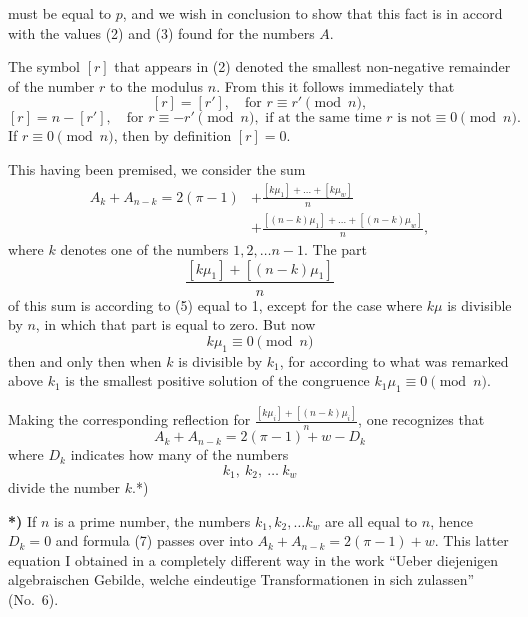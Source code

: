 \documentclass{article}
\begin{document}
must be equal to $p$, and we wish in conclusion to show that this fact is in accord with the values (2) and (3) found for the numbers $A$.

The symbol $[r]$ that appears in (2) denoted the smallest non-negative remainder of the number $r$ to the modulus $n$. From this it follows immediately that
\[
[r] = [r'], \quad \text{for } r \equiv r' \pmod n, \tag{4}
\]
\[
[r] = n - [r'], \quad \text{for } r \equiv -r' \pmod n, \text{ if at the same time } r \text{ is not} \equiv 0 \pmod n. \tag{5}
\]
If $r \equiv 0 \pmod n$, then by definition $[r] = 0$.

This having been premised, we consider the sum
\[
\begin{aligned}
A_k + A_{n-k} = 2(\pi - 1) &+ \frac{[k\mu_1] + \dots + [k\mu_w]}{n} \\
&+ \frac{[(n-k)\mu_1] + \dots + [(n-k)\mu_w]}{n},
\end{aligned} \tag{6}
\]
where $k$ denotes one of the numbers $1, 2, \dots n-1$. The part
\[
\frac{[k\mu_1] + [(n-k)\mu_1]}{n}
\]
of this sum is according to (5) equal to 1, except for the case where $k\mu$ is divisible by $n$, in which that part is equal to zero. But now
\[
k\mu_1 \equiv 0 \pmod n
\]
then and only then when $k$ is divisible by $k_1$, for according to what was remarked above $k_1$ is the smallest positive solution of the congruence $k_1\mu_1 \equiv 0 \pmod n$.

Making the corresponding reflection for $\frac{[k\mu_i] + [(n-k)\mu_i]}{n}$, one recognizes that
\[
A_k + A_{n-k} = 2(\pi - 1) + w - D_k \tag{7}
\]
where $D_k$ indicates how many of the numbers
\[
k_1, \ k_2, \ \dots \ k_w
\]
divide the number $k$.*)

\textbf{*)} If $n$ is a prime number, the numbers $k_1, k_2, \dots k_w$ are all equal to $n$, hence $D_k = 0$ and formula (7) passes over into $A_k + A_{n-k} = 2(\pi - 1) + w$. This latter equation I obtained in a completely different way in the work ``Ueber diejenigen algebraischen Gebilde, welche eindeutige Transformationen in sich zulassen'' (No.~6).
\end{document}
